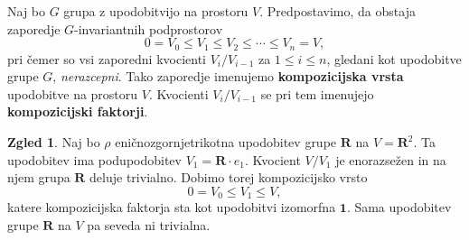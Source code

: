 \documentclass[11pt]{book}
\def\RR{\mathbf{R}}
\def\oneone{\mathbf{1}}
\def\definicija{\color{rdeca}\bf}
\theoremstyle{definition}
\theoremstyle{zgled}
\newtheorem{zgled}[theorem]{Zgled}
\theoremstyle{zgledbrezstevilke}
\theoremstyle{odprtproblem}
\theoremstyle{domacanaloga}
\theoremstyle{izrek}
\begin{document}
Naj bo $G$ grupa z upodobitvijo na prostoru $V$. Predpostavimo, da obstaja zaporedje $G$-invariantnih podprostorov
\[
    0 = V_0 \leq V_1 \leq V_2 \leq \cdots \leq V_n = V,
\]
pri čemer so vsi zaporedni kvocienti $V_i/V_{i-1}$ za $1 \leq i \leq n$, gledani kot upodobitve grupe $G$, \emph{nerazcepni}. Tako zaporedje imenujemo {\definicija kompozicijska vrsta} upodobitve na prostoru $V$. Kvocienti $V_i/V_{i-1}$ se pri tem imenujejo {\definicija kompozicijski faktorji}.

\begin{zgled}
Naj bo $\rho$ eničnozgornjetrikotna upodobitev grupe $\RR$ na $V = \RR^2$. Ta upodobitev ima podupodobitev $V_1 = \RR \cdot e_1$. Kvocient $V/V_1$ je enorazsežen in na njem grupa $\RR$ deluje trivialno. Dobimo torej kompozicijsko vrsto
\[
    0 = V_0 \leq V_1 \leq V,
\]
katere kompozicijska faktorja sta kot upodobitvi izomorfna $\oneone$. Sama upodobitev grupe $\RR$ na $V$ pa seveda ni trivialna.
\end{zgled}
\end{document}
